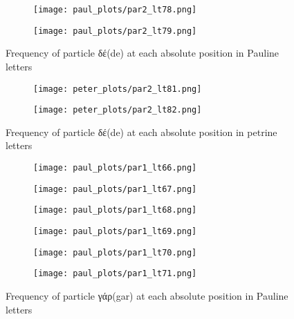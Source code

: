 \documentclass[a4paper]{article}
\begin{document}
\begin{figure}
\ContinuedFloat
\begin{subfigure}{0.45\textwidth}
\centering
\texttt{[image: paul\_plots/par2\_lt78.png]}
\end{subfigure}
\begin{subfigure}{0.45\textwidth}
\centering
\texttt{[image: paul\_plots/par2\_lt79.png]}
\end{subfigure}
\caption{Frequency of particle \textgreek{δέ}(de) at each absolute position in Pauline letters}
\end{figure}

\begin{figure}
\begin{subfigure}{0.45\textwidth}
\centering
\texttt{[image: peter\_plots/par2\_lt81.png]}
\end{subfigure}
\begin{subfigure}{0.45\textwidth}
\centering
\texttt{[image: peter\_plots/par2\_lt82.png]}
\end{subfigure}
\caption{Frequency of particle \textgreek{δέ}(de) at each absolute position in petrine letters}
\label{peter_de}
\end{figure}

\begin{figure}
\begin{subfigure}{0.45\textwidth}
\centering
\texttt{[image: paul\_plots/par1\_lt66.png]}
\end{subfigure}
\begin{subfigure}{0.45\textwidth}
\centering
\texttt{[image: paul\_plots/par1\_lt67.png]}
\end{subfigure}
\begin{subfigure}{0.45\textwidth}
\centering
\texttt{[image: paul\_plots/par1\_lt68.png]}
\end{subfigure}
\begin{subfigure}{0.45\textwidth}
\centering
\texttt{[image: paul\_plots/par1\_lt69.png]}
\end{subfigure}
\begin{subfigure}{0.45\textwidth}
\centering
\texttt{[image: paul\_plots/par1\_lt70.png]}
\end{subfigure}
\begin{subfigure}{0.45\textwidth}
\centering
\texttt{[image: paul\_plots/par1\_lt71.png]}
\end{subfigure}
\caption{Frequency of particle \textgreek{γάρ}(gar) at each absolute position in Pauline letters}
\label{paul_yap}
\end{figure}
\end{document}

